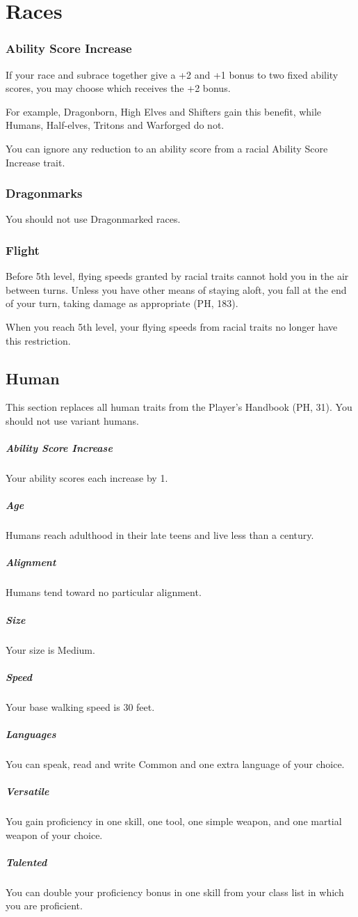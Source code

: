 \documentclass[letterpaper,twocolumn,openany,nodeprecatedcode]{dndbook}
\begin{document}
\section{Races}

\subsubsection{Ability Score Increase}
If your race and subrace together give a +2 and +1 bonus to two fixed ability scores, you may choose which receives the +2 bonus.

For example, Dragonborn, High Elves and Shifters gain this benefit, while Humans, Half-elves, Tritons and Warforged do not.

You can ignore any reduction to an ability score from a racial Ability Score Increase trait.

\subsubsection{Dragonmarks} You should not use Dragonmarked races.

\subsubsection{Flight} Before 5th level, flying speeds granted by racial traits cannot hold you in the air between turns. Unless you have other means of staying aloft, you fall at the end of your turn, taking damage as appropriate (PH, 183).

When you reach 5th level, your flying speeds from racial traits no longer have this restriction.

\subsection{Human}
This section replaces all human traits from the Player's Handbook (PH, 31). You should not use variant humans.

\subparagraph{Ability Score Increase} Your ability scores each increase by 1.
\subparagraph{Age} Humans reach adulthood in their late teens and live less than a century.
\subparagraph{Alignment} Humans tend toward no particular alignment.
\subparagraph{Size} Your size is Medium.
\subparagraph{Speed} Your base walking speed is 30 feet.
\subparagraph{Languages} You can speak, read and write Common and one extra language of your choice.
\subparagraph{Versatile} You gain proficiency in one skill, one tool, one simple weapon, and one martial weapon of your choice.
\subparagraph{Talented} You can double your proficiency bonus in one skill from your class list in which you are proficient.
\end{document}
